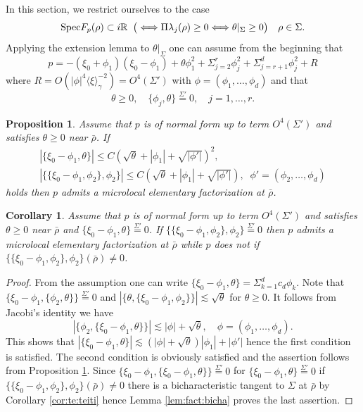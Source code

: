 \documentclass[12pt,leqno]{article} %
\def\sieq{\overset{\Sigma'}{=}}
\def\xig{\langle{\xi}\rangle_{\!\gamma}}
\def\R{{\mathbb R}}
\def\la{\lambda}
\def\bro{\bar\rho}
\def\R{\mathbb{R}}
\def\bro{\bar\rho}
\numberwithin{equation}{section}
\newtheorem{prop}{Proposition}[section]
\newtheorem{cor}{Corollary}[section]
\begin{document}
%
%
In this section, we restrict ourselves to the case 
%
\[
{\rm Spec}F_p(\rho)\subset i\R\;\;\big(\Longleftrightarrow \Pi \la_j(\rho)\geq 0\Longleftrightarrow \theta|_{\Sigma}\geq 0\big)\quad\rho\in \Sigma.
\]
% 
Applying the extension lemma to $\theta\big|_{\Sigma}$ one can assume from the beginning that
%
%
\[
p=-(\xi_0+\phi_1)(\xi_0-\phi_1)+\theta\phi_1^2+\Sigma_{j=2}^r\phi_j^2+\Sigma_{j=r+1}^d\phi_j^2+R
\]
%
where $R=O(|\phi|^4\xig^{-2})=O^4(\Sigma')$ with $\phi=(\phi_1,\ldots,\phi_d)$ and that
%
\begin{equation}
\label{eq:ph:to:te}
\theta\geq 0,\quad \{\phi_j,\theta\}\sieq 0,\quad j=1,\ldots,r.
\end{equation}
%
%
\begin{prop}
\label{pro:kihon:bunkai}Assume that $p$ is of normal form up to term $O^4(\Sigma')$ and satisfies $\theta\geq 0$ near $\bro$. If
%
\begin{gather*}
|\{\xi_0-\phi_1,\theta\}|\leq C(\sqrt{\theta}+|\phi_1|+\sqrt{|\phi'|})^2,\\
 |\{\{\xi_0-\phi_1,\phi_2\},\phi_2\}|\leq C(\sqrt{\theta}+|\phi_1|+\sqrt{|\phi'|}),\;\;\phi'=(\phi_2,\ldots,\phi_d)
\end{gather*}
%
holds then $p$ admits a microlocal elementary factorization at $\bro$.
\end{prop}
%
%
\begin{cor}
\label{cor:kihon:bunkai}Assume that $p$ is of normal form up to term $O^4(\Sigma')$ and satisfies $\theta\geq 0$ near $\bro$ and $\{\xi_0-\phi_1,\theta\}\sieq 0$. If $\{\{\xi_0-\phi_1,\phi_2\},\phi_2\}\sieq 0$ 
%
%
then $p$ admits a microlocal elementary factorization at $\bro$ while $p$ does not if $\{\{\xi_0-\phi_1,\phi_2\},\phi_2\}(\bro)\neq 0$.
\end{cor}
%
\begin{proof}From the assumption one can write $
\{\xi_0-\phi_1,\theta\}=\Sigma_{k=1}^dc_d\phi_k$. 
Note that $\{\xi_0-\phi_1,\{\phi_2,\theta\}\}\sieq 0$ and $|\{\theta,\{\xi_0-\phi_1,\phi_2\}\}|\lesssim \sqrt{\theta}$
 for $\theta\geq 0$. It follows from Jacobi's identity we have 
 \[
 |\{\phi_2,\{\xi_0-\phi_1,\theta\}\}|\lesssim |\phi|+\sqrt{\theta},\quad \phi=(\phi_1,\ldots,\phi_d).
 \]
 This shows that $|\{\xi_0-\phi_1,\theta\}|\lesssim (|\phi|+\sqrt{\theta})|\phi_1|+|\phi'|$ hence the first condition is satisfied. The second condition is obviously satisfied and the assertion follows from Proposition \ref{pro:kihon:bunkai}. Since $\{\xi_0-\phi_1,\{\xi_0-\phi_1,\theta\}\}\sieq 0$ for $\{\xi_0-\phi_1,\theta\}\sieq 0$ if $\{\{\xi_0-\phi_1,\phi_2\},\phi_2\}(\bro)\neq 0$ there is a bicharacteristic tangent to $\Sigma$ at $\bro$ by Corollary \ref{cor:te:teiti} hence Lemma \ref{lem:fact:bicha} proves the last assertion.
 \end{proof}
\end{document}
